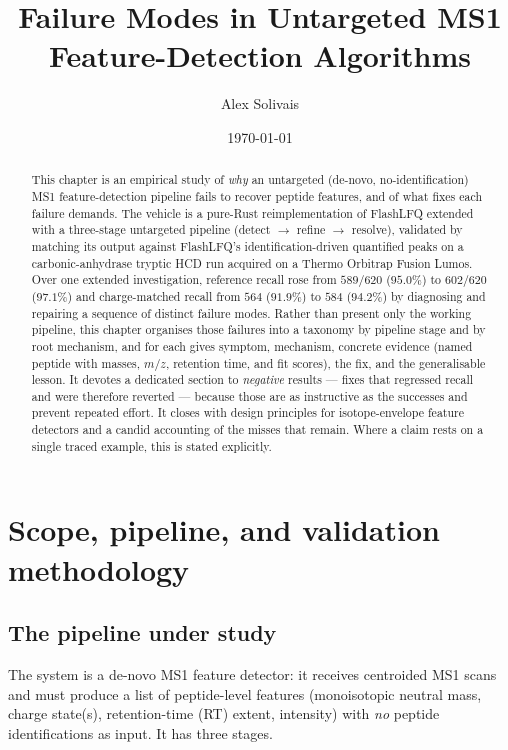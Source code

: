 \documentclass[11pt]{article}
\title{Failure Modes in Untargeted MS1 Feature-Detection Algorithms}
\author{Alex Solivais}
\date{\today}
\newcommand{\mz}{\ensuremath{m/z}}
\begin{document}
\maketitle

\begin{abstract}
This chapter is an empirical study of \emph{why} an untargeted (de-novo, no-identification)
MS1 feature-detection pipeline fails to recover peptide features, and of what fixes
each failure demands. The vehicle is a pure-Rust reimplementation of FlashLFQ extended
with a three-stage untargeted pipeline (detect $\rightarrow$ refine $\rightarrow$ resolve),
validated by matching its output against FlashLFQ's identification-driven quantified peaks
on a carbonic-anhydrase tryptic HCD run acquired on a Thermo Orbitrap Fusion Lumos. Over one
extended investigation, reference recall rose from $589/620$ ($95.0\%$) to $602/620$ ($97.1\%$)
and charge-matched recall from $564$ ($91.9\%$) to $584$ ($94.2\%$) by diagnosing and repairing
a sequence of distinct failure modes. Rather than present only the working pipeline, this chapter
organises those failures into a taxonomy by pipeline stage and by root mechanism, and for each
gives symptom, mechanism, concrete evidence (named peptide with masses, \mz, retention time, and
fit scores), the fix, and the generalisable lesson. It devotes a dedicated section to
\emph{negative} results --- fixes that regressed recall and were therefore reverted --- because
those are as instructive as the successes and prevent repeated effort. It closes with design
principles for isotope-envelope feature detectors and a candid accounting of the misses that
remain. Where a claim rests on a single traced example, this is stated explicitly.
\end{abstract}

\tableofcontents

\section{Scope, pipeline, and validation methodology}
\label{sec:scope}

\subsection{The pipeline under study}
The system is a de-novo MS1 feature detector: it receives centroided MS1 scans and must
produce a list of peptide-level features (monoisotopic neutral mass, charge state(s),
retention-time (RT) extent, intensity) with \emph{no} peptide identifications as input. It
has three stages.
\end{document}
